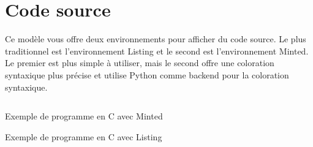 \section{Code source}

Ce modèle vous offre deux environnements pour afficher du code source. Le plus traditionnel est l'environnement Listing et le second est l'environnement Minted. Le premier est plus simple à utiliser, mais le second offre une coloration syntaxique plus précise et utilise Python comme backend pour la coloration syntaxique.

\begin{listing}[h]
    \inputminted{c}{assets/code/fibonacci.c}
    \caption{Exemple de programme en C \label{c} avec Minted}
\end{listing}

\begin{listing}[h]
    
    \caption{Exemple de programme en C \label{c} avec Listing}
\end{listing}